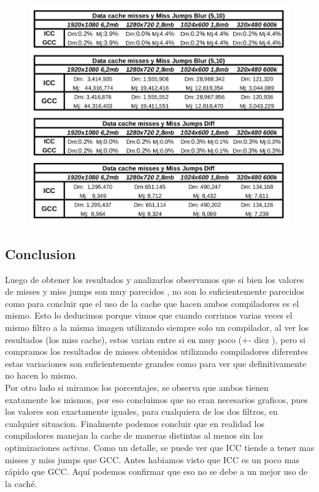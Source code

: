 \begin{figure}[H]
\begin{center}
  \includegraphics[width=\linewidth]{cachecompiladores/tabla.png}
\end{center}
\end{figure}

\subsection{Conclusion}

Luego de obtener los resultados y analizarlos observamos que si bien los valores de misses y miss jumps son muy parecidos , no son lo suficientemente parecidos como para concluir que el uso de la cache que hacen ambos compiladores es el mismo. Esto lo deducimos porque vimos que cuando corrimos varias veces el mismo filtro a la misma imagen utilizando siempre solo un compilador, al ver los resultados (los miss cache), estos varian entre si en muy poco (+- diez ), pero si compramos los resultados de misses obtenidos utilizando compiladores diferentes estas variaciones son suficientemente grandes como para ver que definitivamente no hacen lo mismo. \\

Por otro lado si miramos los porcentajes, se observa que ambos tienen exatamente los mismos, por eso concluimos que no eran necesarios graficos, pues los valores son exactamente iguales, para cualquiera de los dos filtros, en cualquier situacion. Finalmente podemos concluir que en realidad los compiladores manejan la cache de maneras distintas al menos sin las optimizaciones activas. Como un detalle, se puede ver que ICC tiende a tener mas misses y miss jumps que GCC. Antes habiamos visto que ICC es un poco mas rápido que GCC. Aquí podemos confirmar que eso no se debe a un mejor uso de la caché.


